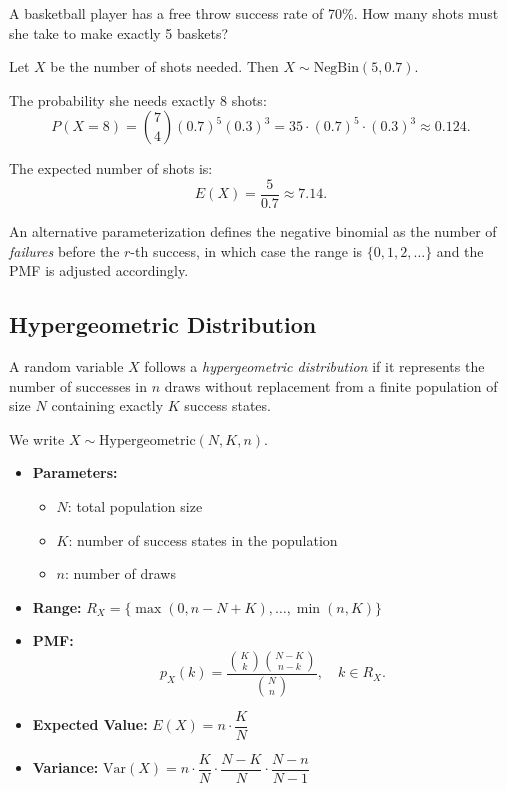 \begin{eg}
A basketball player has a free throw success rate of 70\%. How many shots must she take to make exactly 5 baskets?

Let \(X\) be the number of shots needed. Then \(X \sim \text{NegBin}(5, 0.7)\).

The probability she needs exactly 8 shots:
\[
P(X = 8) = \binom{7}{4} (0.7)^5 (0.3)^3 = 35 \cdot (0.7)^5 \cdot (0.3)^3 \approx 0.124.
\]

The expected number of shots is:
\[
E(X) = \frac{5}{0.7} \approx 7.14.
\]
\end{eg}

\begin{remark}
An alternative parameterization defines the negative binomial as the number of \emph{failures} before the \(r\)-th success, in which case the range is \(\{0, 1, 2, \ldots\}\) and the PMF is adjusted accordingly.
\end{remark}

\subsection{Hypergeometric Distribution}

\begin{definition}
A random variable \(X\) follows a \emph{hypergeometric distribution} if it represents the number of successes in \(n\) draws without replacement from a finite population of size \(N\) containing exactly \(K\) success states.

We write \(X \sim \text{Hypergeometric}(N, K, n)\).
\end{definition}

\begin{itemize}
    \item \textbf{Parameters:}
    \begin{itemize}
        \item \(N\): total population size
        \item \(K\): number of success states in the population
        \item \(n\): number of draws
    \end{itemize}
    
    \item \textbf{Range:} \(R_X = \{\max(0, n-N+K), \ldots, \min(n, K)\}\)
    
    \item \textbf{PMF:}
    \[
    p_X(k) = \frac{\binom{K}{k} \binom{N-K}{n-k}}{\binom{N}{n}}, \quad k \in R_X.
    \]
    
    \item \textbf{Expected Value:} \(E(X) = n \cdot \dfrac{K}{N}\)
    
    \item \textbf{Variance:} \(\text{Var}(X) = n \cdot \dfrac{K}{N} \cdot \dfrac{N-K}{N} \cdot \dfrac{N-n}{N-1}\)
\end{itemize}


